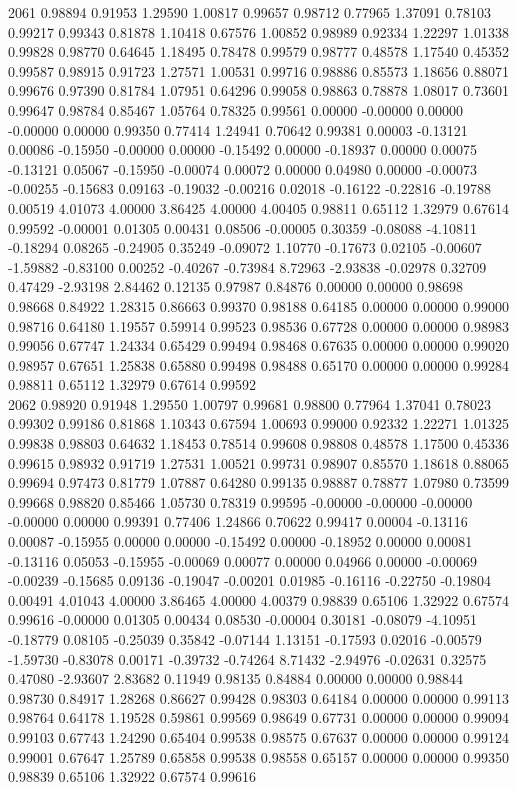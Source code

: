 {2061 0.98894 0.91953 1.29590 1.00817 0.99657 0.98712 0.77965 1.37091 0.78103 0.99217 0.99343 0.81878 1.10418 0.67576 1.00852 0.98989 0.92334 1.22297 1.01338 0.99828 0.98770 0.64645 1.18495 0.78478 0.99579 0.98777 0.48578 1.17540 0.45352 0.99587 0.98915 0.91723 1.27571 1.00531 0.99716 0.98886 0.85573 1.18656 0.88071 0.99676 0.97390 0.81784 1.07951 0.64296 0.99058 0.98863 0.78878 1.08017 0.73601 0.99647 0.98784 0.85467 1.05764 0.78325 0.99561 0.00000 -0.00000 0.00000 -0.00000 0.00000 0.99350 0.77414 1.24941 0.70642 0.99381 0.00003 -0.13121 0.00086 -0.15950 -0.00000 0.00000 -0.15492 0.00000 -0.18937 0.00000 0.00075 -0.13121 0.05067 -0.15950 -0.00074 0.00072 0.00000 0.04980 0.00000 -0.00073 -0.00255 -0.15683 0.09163 -0.19032 -0.00216 0.02018 -0.16122 -0.22816 -0.19788 0.00519 4.01073 4.00000 3.86425 4.00000 4.00405 0.98811 0.65112 1.32979 0.67614 0.99592 -0.00001 0.01305 0.00431 0.08506 -0.00005 0.30359 -0.08088 -4.10811 -0.18294 0.08265 -0.24905 0.35249 -0.09072 1.10770 -0.17673 0.02105 -0.00607 -1.59882 -0.83100 0.00252 -0.40267 -0.73984 8.72963 -2.93838 -0.02978 0.32709 0.47429 -2.93198 2.84462 0.12135 0.97987 0.84876 0.00000 0.00000 0.98698 0.98668 0.84922 1.28315 0.86663 0.99370 0.98188 0.64185 0.00000 0.00000 0.99000 0.98716 0.64180 1.19557 0.59914 0.99523 0.98536 0.67728 0.00000 0.00000 0.98983 0.99056 0.67747 1.24334 0.65429 0.99494 0.98468 0.67635 0.00000 0.00000 0.99020 0.98957 0.67651 1.25838 0.65880 0.99498 0.98488 0.65170 0.00000 0.00000 0.99284 0.98811 0.65112 1.32979 0.67614 0.99592 \\
2062 0.98920 0.91948 1.29550 1.00797 0.99681 0.98800 0.77964 1.37041 0.78023 0.99302 0.99186 0.81868 1.10343 0.67594 1.00693 0.99000 0.92332 1.22271 1.01325 0.99838 0.98803 0.64632 1.18453 0.78514 0.99608 0.98808 0.48578 1.17500 0.45336 0.99615 0.98932 0.91719 1.27531 1.00521 0.99731 0.98907 0.85570 1.18618 0.88065 0.99694 0.97473 0.81779 1.07887 0.64280 0.99135 0.98887 0.78877 1.07980 0.73599 0.99668 0.98820 0.85466 1.05730 0.78319 0.99595 -0.00000 -0.00000 -0.00000 -0.00000 0.00000 0.99391 0.77406 1.24866 0.70622 0.99417 0.00004 -0.13116 0.00087 -0.15955 0.00000 0.00000 -0.15492 0.00000 -0.18952 0.00000 0.00081 -0.13116 0.05053 -0.15955 -0.00069 0.00077 0.00000 0.04966 0.00000 -0.00069 -0.00239 -0.15685 0.09136 -0.19047 -0.00201 0.01985 -0.16116 -0.22750 -0.19804 0.00491 4.01043 4.00000 3.86465 4.00000 4.00379 0.98839 0.65106 1.32922 0.67574 0.99616 -0.00000 0.01305 0.00434 0.08530 -0.00004 0.30181 -0.08079 -4.10951 -0.18779 0.08105 -0.25039 0.35842 -0.07144 1.13151 -0.17593 0.02016 -0.00579 -1.59730 -0.83078 0.00171 -0.39732 -0.74264 8.71432 -2.94976 -0.02631 0.32575 0.47080 -2.93607 2.83682 0.11949 0.98135 0.84884 0.00000 0.00000 0.98844 0.98730 0.84917 1.28268 0.86627 0.99428 0.98303 0.64184 0.00000 0.00000 0.99113 0.98764 0.64178 1.19528 0.59861 0.99569 0.98649 0.67731 0.00000 0.00000 0.99094 0.99103 0.67743 1.24290 0.65404 0.99538 0.98575 0.67637 0.00000 0.00000 0.99124 0.99001 0.67647 1.25789 0.65858 0.99538 0.98558 0.65157 0.00000 0.00000 0.99350 0.98839 0.65106 1.32922 0.67574 0.99616 \\
}
